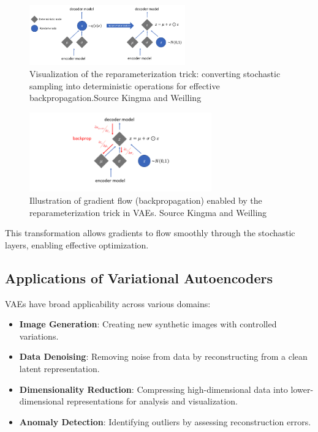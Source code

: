 \begin{figure}[htbp]
    \centering
    \includegraphics[width=0.6\textwidth]{img/vae/reparameterization_trick.png}
    \caption{Visualization of the reparameterization trick: converting stochastic sampling into deterministic operations for effective backpropagation.Source Kingma and Weilling~\cite{Kingma_2019}}
    \label{fig:reparameterization_trick}
\end{figure}

\begin{figure}[htbp]
    \centering
    \includegraphics[width=0.7\textwidth]{img/vae/reparameterization_backprop.png}
    \caption{Illustration of gradient flow (backpropagation) enabled by the reparameterization trick in VAEs. Source Kingma and Weilling~\cite{Kingma_2019}}
    \label{fig:reparameterization_backprop}
\end{figure}


This transformation allows gradients to flow smoothly through the stochastic layers, enabling effective optimization.






\subsection{Applications of Variational Autoencoders}
VAEs have broad applicability across various domains:

\begin{itemize}
\item \textbf{Image Generation}: Creating new synthetic images with controlled variations.
\item \textbf{Data Denoising}: Removing noise from data by reconstructing from a clean latent representation.
\item \textbf{Dimensionality Reduction}: Compressing high-dimensional data into lower-dimensional representations for analysis and visualization.
\item \textbf{Anomaly Detection}: Identifying outliers by assessing reconstruction errors.
\end{itemize}

